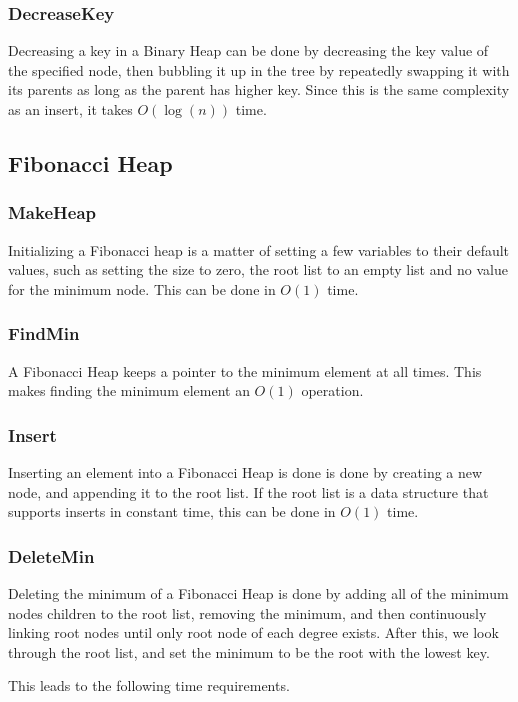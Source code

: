 \subsubsection{DecreaseKey}
Decreasing a key in a Binary Heap can be done by decreasing the key value of the specified node, then bubbling it up in the tree by repeatedly swapping it with its parents as long as the parent has higher key. Since this is the same complexity as an insert, it takes $O(\log (n))$ time.


\subsection{Fibonacci Heap}

\subsubsection{MakeHeap}
Initializing a Fibonacci heap is a matter of setting a few variables to their default values, such as setting the size to zero, the root list to an empty list and no value for the minimum node. This can be done in $O(1)$ time.

\subsubsection{FindMin}
A Fibonacci Heap keeps a pointer to the minimum element at all times. This makes finding the minimum element an $O(1)$ operation.

\subsubsection{Insert}
Inserting an element into a Fibonacci Heap is done is done by creating a new node, and appending it to the root list. If the root list is a data structure that supports inserts in constant time, this can be done in $O(1)$ time.

\subsubsection{DeleteMin}
Deleting the minimum of a Fibonacci Heap is done by adding all of the minimum nodes children to the root list, removing the minimum, and then continuously linking root nodes until only root node of each degree exists. After this, we look through the root list, and set the minimum to be the root with the lowest key.

This leads to the following time requirements. 

